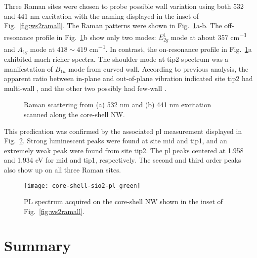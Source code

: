 Three Raman sites were chosen to probe possible wall variation using both 532 and 441 nm excitation with the naming displayed in the inset of Fig.~\ref{fig:ws2ramall}. The Raman patterns were shown in Fig.~\ref{fig:ws2ram3site}a-b. The off-resonance profile in Fig.~\ref{fig:ws2ram3site}b show only two modes: $E_{2g}^1$ mode at about 357 \si{cm^{-1}} and $A_{1g}$ mode at $418\sim419$ \si{cm^{-1}}. In contrast, the on-resonance profile in Fig.~\ref{fig:ws2ram3site}a exhibited much richer spectra. The shoulder mode at tip2 spectrum was a manifestation of $B_{1u}$ mode from curved  wall. According to previous analysis, the apparent ratio between in-plane and out-of-plane vibration indicated site tip2 had multi-wall , and the other two possibly had few-wall . 
\begin{figure}[htb]
\centering
{}\hspace{0.04\textwidth}
\caption[Raman scattering from two excitation wavelength]{Raman scattering from (a) 532 nm and (b) 441 nm excitation scanned along the core-shell NW.}
\label{fig:ws2ram3site}
\end{figure}
This predication was confirmed by the associated \gls{pl} measurement displayed in Fig.~\ref{fig:ws2plgreen}. Strong luminescent peaks were found at site mid and tip1, and an extremely weak peak were found from site tip2. The \gls{pl} peaks centered at 1.958 and 1.934 eV for mid and tip1, respectively. The second and third order peaks also show up on all three Raman sites. 
\begin{figure}[htb]
\centering
\texttt{[image: core-shell-sio2-pl\_green]}
\caption[PL spectra of - on -Si]{PL spectrum acquired on the core-shell NW shown in the inset of Fig.~\ref{fig:ws2ramall}.}
\label{fig:ws2plgreen}
\end{figure}

\section{Summary} 

